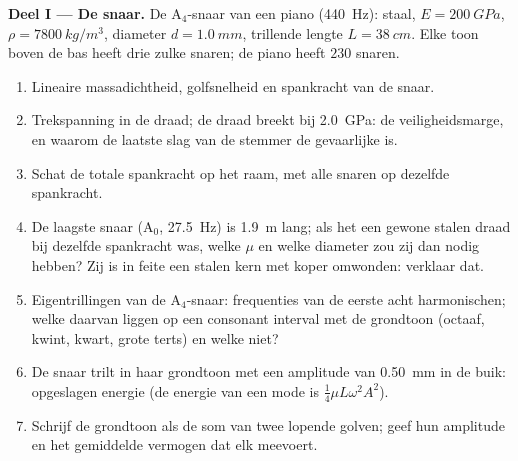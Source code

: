 \begin{problem}
\label{pb:b2:waves-on-strings:1}

\medskip
\noindent\textbf{Deel I --- De snaar.}
De A$_4$-snaar van een piano (\qty{440}{Hz}): staal, $E = \qty{200}{GPa}$,
$\rho =
\qty{7800}{kg/m^3}$, diameter $d = \qty{1.0}{mm}$, trillende lengte
$L =
\qty{38}{cm}$. Elke toon boven de bas heeft drie zulke snaren; de piano
heeft $230$ snaren.
\begin{enumerate}
  \item Lineaire massadichtheid, golfsnelheid en spankracht van de snaar.
  \item Trekspanning in de draad; de draad breekt bij \qty{2.0}{GPa}: de
        veiligheidsmarge, en waarom de laatste slag van de stemmer de
        gevaarlijke is.
  \item Schat de totale spankracht op het raam, met alle snaren op dezelfde
        spankracht.
  \item De laagste snaar (A$_0$, \qty{27.5}{Hz}) is \qty{1.9}{m} lang; als
        het een gewone stalen draad bij dezelfde spankracht was, welke $\mu$
        en welke diameter zou zij dan nodig hebben? Zij is in feite een
        stalen kern met koper omwonden: verklaar dat.
  \item Eigentrillingen van de A$_4$-snaar: frequenties van de eerste acht
        harmonischen; welke daarvan liggen op een consonant interval met de
        grondtoon (octaaf, kwint, kwart, grote terts) en welke niet?
  \item De snaar trilt in haar grondtoon met een amplitude van
        \qty{0.50}{mm} in de buik: opgeslagen energie (de energie van een
        mode is $\tfrac14\mu L\omega^2A^2$).
  \item Schrijf de grondtoon als de som van twee lopende golven; geef hun
        amplitude en het gemiddelde vermogen dat elk meevoert.
\end{enumerate}


\end{problem}
